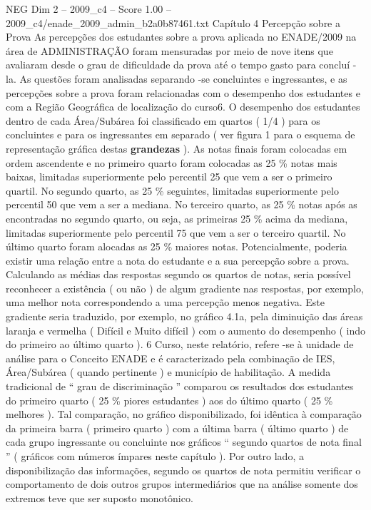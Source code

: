 \begin{textsample}{NEG Dim 2 – 2009\_c4 – Score 1.00 – 2009\_c4/enade\_2009\_admin\_b2a0b87461.txt}  \label{ex:f2_neg_234}
Capítulo 4 Percepção sobre a Prova As percepções dos estudantes sobre a prova aplicada no ENADE/2009 na área de ADMINISTRAÇÃO foram mensuradas por meio de nove itens que avaliaram desde o grau de dificuldade da prova até o tempo gasto para concluí -la.
As questões foram analisadas separando -se concluintes e ingressantes, e as percepções sobre a prova foram relacionadas com o desempenho dos estudantes e com a Região Geográfica de localização do curso6.
O desempenho dos estudantes dentro de cada Área/Subárea foi classificado em quartos ( 1/4 ) para os concluintes e para os ingressantes em separado ( ver figura 1 para o esquema de representação gráfica destas \textbf{grandezas} ).
As notas finais foram colocadas em ordem ascendente e no primeiro quarto foram colocadas as 25 \% notas mais baixas, limitadas superiormente pelo percentil 25 que vem a ser o primeiro quartil.
No segundo quarto, as 25 \% seguintes, limitadas superiormente pelo percentil 50 que vem a ser a mediana.
No terceiro quarto, as 25 \% notas após as encontradas no segundo quarto, ou seja, as primeiras 25 \% acima da mediana, limitadas superiormente pelo percentil 75 que vem a ser o terceiro quartil.
No último quarto foram alocadas as 25 \% maiores notas.
Potencialmente, poderia existir uma relação entre a nota do estudante e a sua percepção sobre a prova.
Calculando as médias das respostas segundo os quartos de notas, seria possível reconhecer a existência ( ou não ) de algum gradiente nas respostas, por exemplo, uma melhor nota correspondendo a uma percepção menos negativa.
Este gradiente seria traduzido, por exemplo, no gráfico 4.1a, pela diminuição das áreas laranja e vermelha ( Difícil e Muito difícil ) com o aumento do desempenho ( indo do primeiro ao último quarto ). 6 Curso, neste relatório, refere -se à unidade de análise para o Conceito ENADE e é caracterizado pela combinação de IES, Área/Subárea ( quando pertinente ) e município de habilitação.
A medida tradicional de “ grau de discriminação ” comparou os resultados dos estudantes do primeiro quarto ( 25 \% piores estudantes ) aos do último quarto ( 25 \% melhores ).
Tal comparação, no gráfico disponibilizado, foi idêntica à comparação da primeira barra ( primeiro quarto ) com a última barra ( último quarto ) de cada grupo ingressante ou concluinte nos gráficos “ segundo quartos de nota final ” ( gráficos com números ímpares neste capítulo ).
Por outro lado, a disponibilização das informações, segundo os quartos de nota permitiu verificar o comportamento de dois outros grupos intermediários que na análise somente dos extremos teve que ser suposto monotônico.

\end{textsample}
